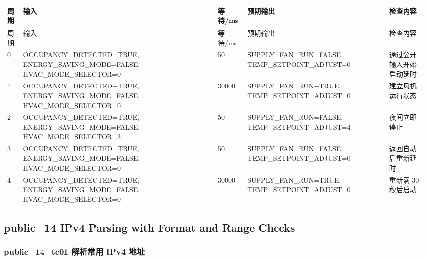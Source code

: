 \begin{longtable}{L{1.0cm}L{4.7cm}L{1.4cm}L{4.0cm}L{2.1cm}}

\toprule

周期 & 输入 & 等待/ms & 预期输出 & 检查内容\\

\midrule

\endfirsthead

\toprule

周期 & 输入 & 等待/ms & 预期输出 & 检查内容\\

\midrule

\endhead

0 & OCCUPANCY\_DETECTED=TRUE, ENERGY\_SAVING\_MODE=FALSE, HVAC\_MODE\_SELECTOR=0 & 50 & SUPPLY\_FAN\_RUN=FALSE, TEMP\_SETPOINT\_ADJUST=0 & 通过公开输入开始启动延时\\

1 & OCCUPANCY\_DETECTED=TRUE, ENERGY\_SAVING\_MODE=FALSE, HVAC\_MODE\_SELECTOR=0 & 30000 & SUPPLY\_FAN\_RUN=TRUE, TEMP\_SETPOINT\_ADJUST=0 & 建立风机运行状态\\

2 & OCCUPANCY\_DETECTED=TRUE, ENERGY\_SAVING\_MODE=FALSE, HVAC\_MODE\_SELECTOR=3 & 50 & SUPPLY\_FAN\_RUN=FALSE, TEMP\_SETPOINT\_ADJUST=4 & 夜间立即停止\\

3 & OCCUPANCY\_DETECTED=TRUE, ENERGY\_SAVING\_MODE=FALSE, HVAC\_MODE\_SELECTOR=0 & 50 & SUPPLY\_FAN\_RUN=FALSE, TEMP\_SETPOINT\_ADJUST=0 & 返回自动后重新延时\\

4 & OCCUPANCY\_DETECTED=TRUE, ENERGY\_SAVING\_MODE=FALSE, HVAC\_MODE\_SELECTOR=0 & 30000 & SUPPLY\_FAN\_RUN=TRUE, TEMP\_SETPOINT\_ADJUST=0 & 重新满 30 秒后启动\\

\bottomrule

\end{longtable}

\subsection{{\ttfamily public\_14} IPv4 Parsing with Format and Range Checks}

\subsubsection{{\ttfamily public\_14\_tc01} 解析常用 IPv4 地址}

